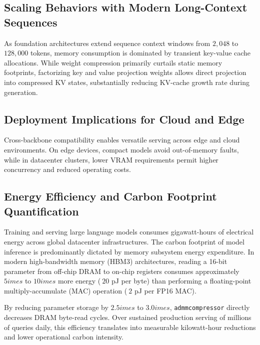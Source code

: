 \subsection{Scaling Behaviors with Modern Long-Context Sequences}
As foundation architectures extend sequence context windows from $2{,}048$ to $128{,}000$ tokens, memory consumption is dominated by transient key-value cache allocations. While weight compression primarily curtails static memory footprints, factorizing key and value projection weights allows direct projection into compressed KV states, substantially reducing KV-cache growth rate during generation.

\subsection{Deployment Implications for Cloud and Edge}
Cross-backbone compatibility enables versatile serving across edge and cloud environments. On edge devices, compact models avoid out-of-memory faults, while in datacenter clusters, lower VRAM requirements permit higher concurrency and reduced operating costs.

\subsection{Energy Efficiency and Carbon Footprint Quantification}
Training and serving large language models consumes gigawatt-hours of electrical energy across global datacenter infrastructures. The carbon footprint of model inference is predominantly dictated by memory subsystem energy expenditure. In modern high-bandwidth memory (HBM3) architectures, reading a 16-bit parameter from off-chip DRAM to on-chip registers consumes approximately $5	imes$ to $10	imes$ more energy ($~20$ pJ per byte) than performing a floating-point multiply-accumulate (MAC) operation ($~2$ pJ per FP16 MAC).

By reducing parameter storage by $2.5	imes$ to $3.0	imes$, \texttt{admmcompressor} directly decreases DRAM byte-read cycles. Over sustained production serving of millions of queries daily, this efficiency translates into measurable kilowatt-hour reductions and lower operational carbon intensity.
